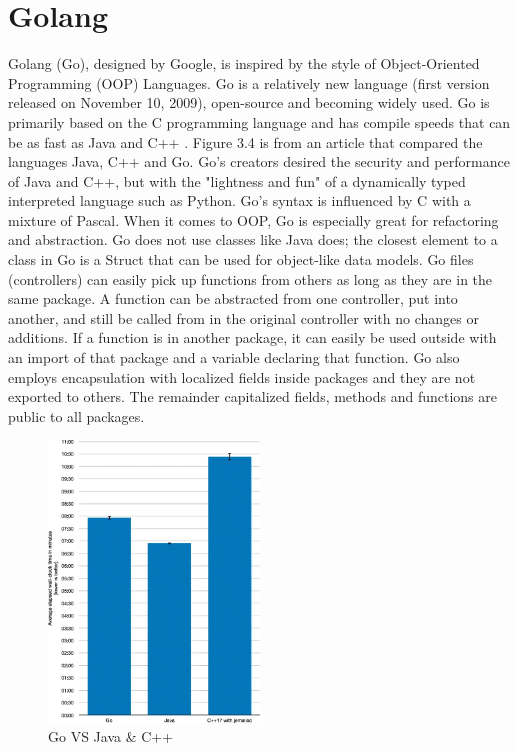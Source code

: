 \section{Golang}
Golang (Go), designed by Google, is inspired by the style of Object-Oriented Programming (OOP) Languages. Go is a relatively new language (first version released on November 10, 2009), open-source and becoming widely used. Go is primarily based on the C programming language and has compile speeds that can be as fast as Java and C++ \cite{ref7}. Figure 3.4 is from an article that compared the languages Java, C++ and Go. Go's creators desired the security and performance of Java and C++, but with the "lightness and fun" of a dynamically typed interpreted language such as Python. Go's syntax is influenced by C with a mixture of Pascal. \cite{ref8}
When it comes to OOP, Go is especially great for refactoring and abstraction. Go does not use classes like Java does; the closest element to a class in Go is a Struct that can be used for object-like data models. \cite{ref9} Go files (controllers) can easily pick up functions from others as long as they are in the same package. A function can be abstracted from one controller, put into another, and still be called from in the original controller with no changes or additions. If a function is in another package, it can easily be used outside with an import of that package and a variable declaring that function. Go also employs encapsulation with localized fields inside packages and they are not exported to others. The remainder capitalized fields, methods and functions are public to all packages. \cite{ref9}

\begin{figure}[H]
    \caption{Go VS Java \& C++ \cite{ref7}}
    \label{image:goJavaCpp}
    \centering
    \includegraphics[width=0.5\textwidth]{images/misc/go-java-cpp.png}
\end{figure}

